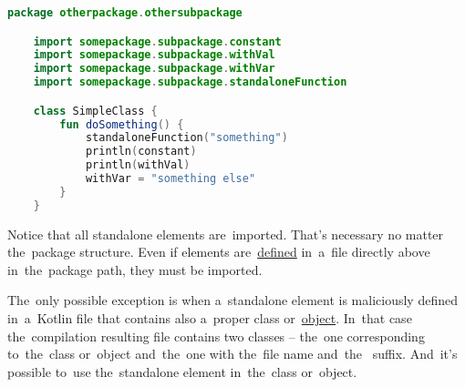 \begin{lstlisting}[language=Kotlin,title={Usage}]
    package otherpackage.othersubpackage

    import somepackage.subpackage.constant
    import somepackage.subpackage.withVal
    import somepackage.subpackage.withVar
    import somepackage.subpackage.standaloneFunction

    class SimpleClass {
        fun doSomething() {
            standaloneFunction("something")
            println(constant)
            println(withVal)
            withVar = "something else"
        }
    }
\end{lstlisting}
\noindent Notice that all standalone elements are~imported.
That's necessary no matter the~package structure.
Even if elements are~\hyperref[declarationdefinition]{defined} in~a~file directly above in~the~package path, they must be imported.

The~only possible exception is when a~standalone element is maliciously defined in~a~Kotlin file that contains also a~proper class or~\hyperref[kotlinobject]{object}.
In~that case the~compilation resulting  file contains two classes -- the~one corresponding to~the~class or~object and~the~one with the~file name \mbox{and the } suffix.
And~it's possible to~use the~standalone element in~the~class or~object.
